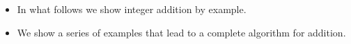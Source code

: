\begin{frame}
\begin{itemize}
\item In what follows we show integer addition by example.
\item<2-> We show a series of examples that lead to a complete algorithm for addition.
\end{itemize}
\end{frame}